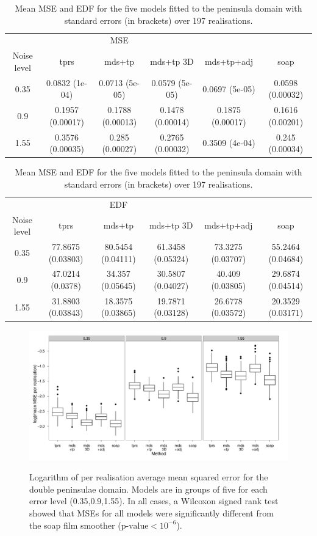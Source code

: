 \begin{table}
\centering
\begin{tabular}{c c c c c c}
 & &  MSE  & & &\\ 
Noise level  & tprs & mds+tp & mds+tp 3D & mds+tp+adj & soap\\ 
\hline
0.35  & 0.0832 (1e-04) & 0.0713 (5e-05) &  0.0579 (5e-05) & 0.0697 (5e-05) & 0.0598 (0.00032) \\ 
0.9  & 0.1957 (0.00017) & 0.1788 (0.00013) & 0.1478 (0.00014) & 0.1875 (0.00017) & 0.1616 (0.00201) \\ 
1.55  & 0.3576 (0.00035) & 0.285 (0.00027) & 0.2765 (0.00032) & 0.3509 (4e-04) & 0.245 (0.00034) \\
\end{tabular}
\begin{tabular}{c c c c c c}
 & &  EDF  & & &\\ 
Noise level  & tprs & mds+tp & mds+tp 3D & mds+tp+adj & soap\\ 
\hline
0.35  & 77.8675 (0.03803) & 80.5454 (0.04111) & 61.3458 (0.05324) & 73.3275 (0.03707) & 55.2464 (0.04684)\\ 
0.9  & 47.0214 (0.0378) & 34.357 (0.05645)  & 30.5807 (0.04027) & 40.409 (0.03805) & 29.6874 (0.04514) \\
1.55  & 31.8803 (0.03843) & 18.3575 (0.03865) & 19.7871 (0.03128) & 26.6778 (0.03572) & 20.3529 (0.03171)\\ 
\end{tabular}
\caption{Mean MSE and EDF for the five models fitted to the peninsula domain with standard errors (in brackets) over 197 realisations.}
\label{bigwt2resultstable}
\end{table}

\begin{figure}
\centering
\includegraphics[width=9.5in]{mds/figs/big-mds-wt2-boxplot.pdf} \\
\caption{Logarithm of per realisation average mean squared error for the double peninsulae domain. Models are in groups of five for each error level (0.35,0.9,1.55). In all cases, a Wilcoxon signed rank test showed that MSEs for all models were significantly different from the soap film smoother ($\text{p-value} < 10^{-6}$).}
\label{big-wt2-mses}
\end{figure}


